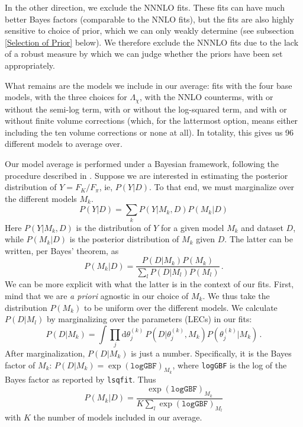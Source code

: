 \documentclass[prd,tightenlines,preprintnumbers,showpacs,superscriptaddress,notitlepage,eqsecnum,floatfix,notitlepage]{revtex4-1}
\begin{document}
In the other direction, we exclude the NNNLO fits. These fits can have much better Bayes factors (comparable to the NNLO fits), but the fits are also highly sensitive to choice of prior, which we can only weakly determine (see subsection \ref{Selection of Prior} below). We therefore exclude the NNNLO fits due to the lack of a robust measure by which we can judge whether the priors have been set appropriately.

What remains are the models we include in our average: fits with the four base models, with the three choices for $\Lambda_\chi$, with the NNLO counterms, with or without the semi-log term, with or without the log-squared term, and with or without finite volume corrections (which, for the lattermost option, means either including the ten volume corrections or none at all). In totality, this gives us 96 different models to average over.

Our model average is performed under a Bayesian framework, following the procedure described in \cite{Chang_2018}. Suppose we are interested in estimating the posterior distribution of $Y = F_K / F_\pi$, ie, $P(Y|D)$. To that end, we must marginalize over the different models $M_k$. 
\begin{equation}
P(Y|D) = \sum_k P(Y | M_k, D) P(M_k | D)
\end{equation}
Here $P(Y | M_k, D)$ is the distribution of $Y$ for a given model $M_k$ and dataset $D$, while $P(M_k | D)$ is the posterior distribution of $M_k$ given $D$. The latter can be written, per Bayes' theorem, as 
\begin{equation}
P(M_k | D) = \frac{P(D | M_k) P(M_k)}{\sum_l P(D | M_l) P(M_l)} \, .
\end{equation}
We can be more explicit with what the latter is in the context of our fits. First, mind that we are \emph{a priori} agnostic in our choice of $M_k$. We thus take the distribution $P(M_k)$ to be uniform over the different models. We calculate $P(D | M_l)$ by marginalizing over the parameters (LECs) in our fits:
\begin{equation}
P(D | M_k) = \int \prod_j \text{d} \theta_j^{(k)} \,  P(D | \theta_j^{(k)}, M_k) P(\theta_j^{(k)} | M_k) \, .
\end{equation}
After marginalization, $P(D | M_k)$ is just a number. Specifically, it is the Bayes factor of $M_k$: $P(D | M_k) = \exp(\texttt{logGBF})_{M_k}$, where \texttt{logGBF} is the log of the Bayes factor as reported by \texttt{lsqfit}. Thus
\begin{equation}
P(M_k | D) = \frac{\exp(\texttt{logGBF})_{M_k}}{K \sum_l \exp(\texttt{logGBF})_{M_l}}
\end{equation}
with $K$ the number of models included in our average.
\end{document}
